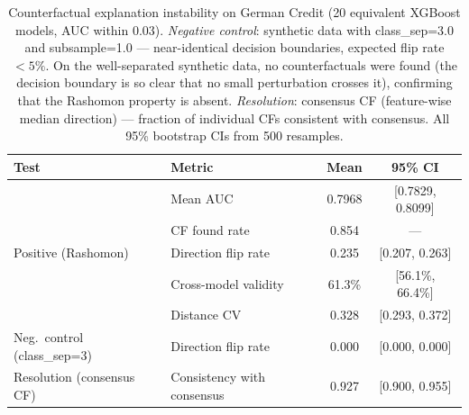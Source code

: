 \begin{table}[t]
\centering
\caption{Counterfactual explanation instability on German Credit (20 equivalent XGBoost models, AUC within 0.03).
  \emph{Negative control}: synthetic data with class\_sep=3.0 and subsample=1.0 --- near-identical decision boundaries, expected flip rate $<5\%$.  On the well-separated synthetic data, no counterfactuals were found (the decision boundary is so clear that no small perturbation crosses it), confirming that the Rashomon property is absent.
  \emph{Resolution}: consensus CF (feature-wise median direction) --- fraction of individual CFs consistent with consensus.
  All 95\% bootstrap CIs from 500 resamples.}
\label{tab:counterfactual-instability}
\setlength{\tabcolsep}{6pt}
\begin{tabular}{llcc}
\toprule
Test & Metric & Mean & 95\% CI \\
\midrule
\multirow{5}{*}{Positive (Rashomon)} & Mean AUC & 0.7968 & [0.7829, 0.8099] \\
& CF found rate & 0.854 & --- \\
& Direction flip rate & 0.235 & [0.207, 0.263] \\
& Cross-model validity & 61.3\% & [56.1\%, 66.4\%] \\
& Distance CV & 0.328 & [0.293, 0.372] \\
\midrule
Neg.\ control (class\_sep=3) & Direction flip rate & 0.000 & [0.000, 0.000] \\
\midrule
Resolution (consensus CF) & Consistency with consensus & 0.927 & [0.900, 0.955] \\
\bottomrule
\end{tabular}
\end{table}
